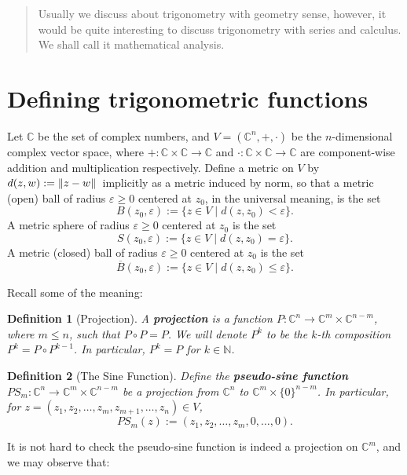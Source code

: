 \documentclass[12pt]{article}
\newtheorem*{definition}{Definition}
\begin{document}
    \begin{abstract}
        Usually we discuss about trigonometry with geometry sense, however, it would be quite interesting to discuss trigonometry with series and calculus. We shall call it mathematical analysis.
    \end{abstract}

    \section*{Defining trigonometric functions}

    Let $\mathbb{C}$ be the set of complex numbers, and $V=(\mathbb{C}^n,+,\cdot)$ be the $n$-dimensional complex vector space, where $+:\mathbb{C}\times\mathbb{C}\to\mathbb{C}$ and $\cdot:\mathbb{C}\times\mathbb{C}\to\mathbb{C}$ are component-wise addition and multiplication respectively. Define a metric on $V$ by $d(z,w):=\norm*{z-w}$ implicitly as a metric induced by norm, so that a metric (open) ball of radius $\varepsilon\geq 0$ centered at $z_0$, in the universal meaning, is the set \[B(z_0,\varepsilon):=\{z\in V\mid d(z,z_0)<\varepsilon\}.\] A metric sphere of radius $\varepsilon\geq 0$ centered at $z_0$ is the set \[S(z_0,\varepsilon):=\{z\in V\mid d(z,z_0)=\varepsilon\}.\] A metric (closed) ball of radius $\varepsilon\geq 0$ centered at $z_0$ is the set \[\overline{B}(z_0,\varepsilon):=\{z\in V\mid d(z,z_0)\leq\varepsilon\}.\]
    
    Recall some of the meaning:

    \begin{definition}[Projection]
        A \textbf{projection} is a function $P:\mathbb{C}^n\to\mathbb{C}^m\times \mathbb{C}^{n-m}$, where $m\leq n$, such that $P\circ P = P$. We will denote $P^k$ to be the $k$-th composition $P^k=P\circ P^{k-1}$. In particular, $P^k=P$ for $k\in\mathbb{N}$.
    \end{definition}

    \begin{definition}[The Sine Function]
        Define the \textbf{pseudo-sine function} $PS_m:\mathbb{C}^n\to\mathbb{C}^m\times \mathbb{C}^{n-m}$ be a projection from $\mathbb{C}^n$ to $\mathbb{C}^m\times\{0\}^{n-m}$. In particular, for $z=(z_1,z_2,\dots,z_m,z_{m+1},\dots,z_n)\in V$,  \[PS_m(z):=(z_1,z_2,\dots,z_m,0,\dots,0).\]
    \end{definition}

    It is not hard to check the pseudo-sine function is indeed a projection on $\mathbb{C}^m$, and we may observe that:
\end{document}
